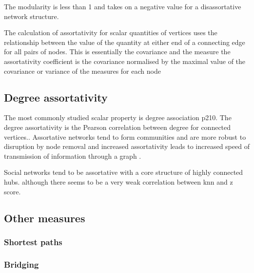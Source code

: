 The modularity is less than 1 and takes on a negative value for a disassortative network structure.

The calculation of assortativity for scalar quantities of vertices uses the relationship between the value of the quantity at either end of a connecting edge for all pairs of nodes. This is essentially the covariance and the measure the assortativity coefficient is the covariance normalised by the maximal value of the covariance or variance of the measures for each node 

\subsection{Degree assortativity}
\label{sec:degree assortativity}

The most commonly studied scalar property is degree association \cite{newman2018networks}p210. The degree assortativity is the Pearson correlation between degree for connected vertices.\cite{noldus2015assortativity}. Assortative networks tend to form communities and are more robust to disruption by node removal  \cite{newman2002assortative} and increased assortativity leads to increased speed of transmission of information through a graph \cite{noldus2015assortativity}.

Social networks tend to be assortative with a core structure of highly connected hubs. \cite{newman2018networks}
 although there seems to be a very weak correlation between knn and z score. 



\subsection{Other measures}
\subsubsection{Shortest paths}


\subsubsection{Bridging}

\cite{valente2010bridging}


